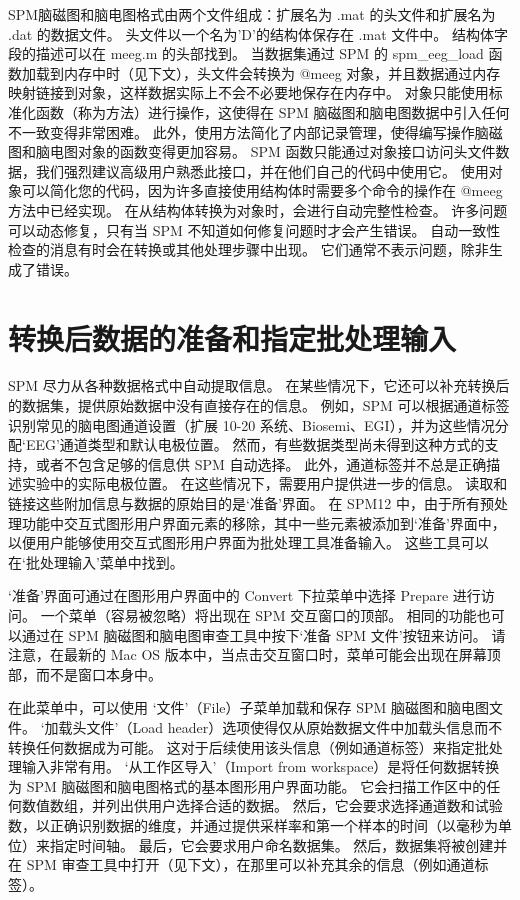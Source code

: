 SPM脑磁图和脑电图格式由两个文件组成：扩展名为 .mat 的头文件和扩展名为 .dat 的数据文件。
头文件以一个名为'D'的结构体保存在 .mat 文件中。
结构体字段的描述可以在 meeg.m 的头部找到。
当数据集通过 SPM 的 spm\_eeg\_load 函数加载到内存中时（见下文），头文件会转换为 @meeg 对象，并且数据通过内存映射链接到对象，这样数据实际上不会不必要地保存在内存中。
对象只能使用标准化函数（称为方法）进行操作，这使得在 SPM 脑磁图和脑电图数据中引入任何不一致变得非常困难。
此外，使用方法简化了内部记录管理，使得编写操作脑磁图和脑电图对象的函数变得更加容易。
SPM 函数只能通过对象接口访问头文件数据，我们强烈建议高级用户熟悉此接口，并在他们自己的代码中使用它。
使用对象可以简化您的代码，因为许多直接使用结构体时需要多个命令的操作在 @meeg 方法中已经实现。
在从结构体转换为对象时，会进行自动完整性检查。
许多问题可以动态修复，只有当 SPM 不知道如何修复问题时才会产生错误。
自动一致性检查的消息有时会在转换或其他处理步骤中出现。
它们通常不表示问题，除非生成了错误。


\section{转换后数据的准备和指定批处理输入}


SPM 尽力从各种数据格式中自动提取信息。
在某些情况下，它还可以补充转换后的数据集，提供原始数据中没有直接存在的信息。
例如，SPM 可以根据通道标签识别常见的脑电图通道设置（扩展 10-20 系统、Biosemi、EGI），并为这些情况分配‘EEG’通道类型和默认电极位置。
然而，有些数据类型尚未得到这种方式的支持，或者不包含足够的信息供 SPM 自动选择。
此外，通道标签并不总是正确描述实验中的实际电极位置。
在这些情况下，需要用户提供进一步的信息。
读取和链接这些附加信息与数据的原始目的是‘准备’界面。
在 SPM12 中，由于所有预处理功能中交互式图形用户界面元素的移除，其中一些元素被添加到‘准备’界面中，以便用户能够使用交互式图形用户界面为批处理工具准备输入。
这些工具可以在‘批处理输入’菜单中找到。

‘准备’界面可通过在图形用户界面中的 Convert 下拉菜单中选择 Prepare 进行访问。
一个菜单（容易被忽略）将出现在 SPM 交互窗口的顶部。
相同的功能也可以通过在 SPM 脑磁图和脑电图审查工具中按下‘准备 SPM 文件’按钮来访问。
请注意，在最新的 Mac OS 版本中，当点击交互窗口时，菜单可能会出现在屏幕顶部，而不是窗口本身中。

在此菜单中，可以使用 ‘文件’（File）子菜单加载和保存 SPM 脑磁图和脑电图文件。
‘加载头文件’（Load header）选项使得仅从原始数据文件中加载头信息而不转换任何数据成为可能。
这对于后续使用该头信息（例如通道标签）来指定批处理输入非常有用。
‘从工作区导入’（Import from workspace）是将任何数据转换为 SPM 脑磁图和脑电图格式的基本图形用户界面功能。
它会扫描工作区中的任何数值数组，并列出供用户选择合适的数据。
然后，它会要求选择通道数和试验数，以正确识别数据的维度，并通过提供采样率和第一个样本的时间（以毫秒为单位）来指定时间轴。
最后，它会要求用户命名数据集。
然后，数据集将被创建并在 SPM 审查工具中打开（见下文），在那里可以补充其余的信息（例如通道标签）。

